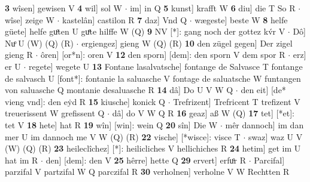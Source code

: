 \documentclass[8pt,a4paper,notitlepage]{article}
\begin{document}
\begin{table}[ht]
\begin{minipage}[t]{0.5\linewidth}
\textbf{3} wîsen] gewisen V \textbf{4} wil] sol W  $\cdot$ im] in Q \textbf{5} kunst] krafft W \textbf{6} diu] die T So R  $\cdot$ wîse] zeige W  $\cdot$ kastelân] castilon R \textbf{7} daz] Vnd Q  $\cdot$ wægeste] beste W \textbf{8} helfe güete] helfe guͦten U guͤte hilffe W (Q) \textbf{9} NV [*]: gang noch der gottez kv́r V  $\cdot$ Dô] Nuͦ U (W) (Q) (R)  $\cdot$ ergiengez] gieng W (Q) (R) \textbf{10} den zügel gegen] Der zigel gieng R  $\cdot$ ôren] [or*n]: oren V \textbf{12} den sporn] [dem]: den sporn V dem spor R  $\cdot$ erz] er U  $\cdot$ regete] wegete U \textbf{13} Fontane lasalvatsche] fontange de Salvasce T fontange de salvasch U [font*]: fontanie la saluasche V fontage de saluatsche W funtangen von saluasche Q montanie desaluasche R \textbf{14} dâ] Do U V W Q  $\cdot$ den eit] [de* vieng vnd]: den eẏd R \textbf{15} kiusche] konick Q  $\cdot$ Trefrizent] Trefricent T trefizent V treuerissent W grefissent Q  $\cdot$ dâ] do V W Q R \textbf{16} geaz] aß W (Q) \textbf{17} tet] [*et]: tet V \textbf{18} hete] hat R \textbf{19} wîn] [win]: wein Q \textbf{20} sîn] Die W  $\cdot$ mêr dannoch] im dan mer U im dannoch me V W (Q) (R) \textbf{22} vische] [*wisce]: visce T  $\cdot$ swaz] waz U V (W) (Q) (R) \textbf{23} heileclîchez] [*]: heilicliches V hellichiches R \textbf{24} hetim] get im U hat im R  $\cdot$ den] [dem]: den V \textbf{25} hêrre] hette Q \textbf{29} ervert] erfuͦr R  $\cdot$ Parcifal] parzifal V partzifal W Q parczifal R \textbf{30} verholnen] verholne V W Rechtten R \newline
\end{minipage}
\end{table}
\end{document}
